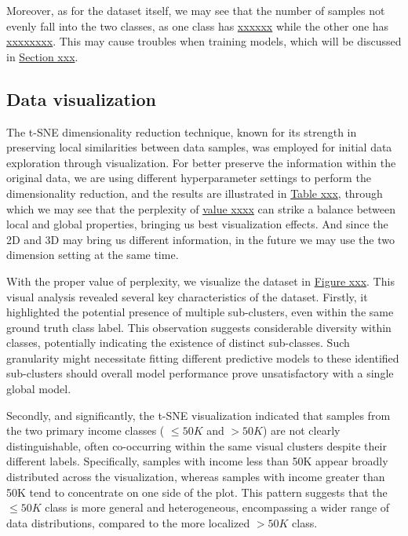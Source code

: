 \documentclass{article}
\begin{document}
Moreover, as for the dataset itself, we may see that the number of samples not evenly fall into the two classes, as one class has \underline{xxxxxx} while the other one has \underline{xxxxxxxx}. This may cause troubles when training models, which will be discussed in \underline{Section xxx}.



\subsection{Data visualization}



The t-SNE dimensionality reduction technique, known for its strength in preserving local similarities between data samples, was employed for initial data exploration through visualization. For better preserve the information within the original data, we are using different hyperparameter settings to perform the dimensionality reduction, and the results are illustrated in \underline{Table xxx}, through which we may see that the perplexity of \underline{value xxxx} can strike a balance between local and global properties, bringing us best visualization effects. And since the 2D and 3D may bring us different information, in the future we may use the two dimension setting at the same time.

With the proper value of perplexity, we visualize the dataset in \underline{Figure xxx}. This visual analysis revealed several key characteristics of the dataset. Firstly, it highlighted the potential presence of multiple sub-clusters, even within the same ground truth class label. This observation suggests considerable diversity within classes, potentially indicating the existence of distinct sub-classes. Such granularity might necessitate fitting different predictive models to these identified sub-clusters should overall model performance prove unsatisfactory with a single global model.

Secondly, and significantly, the t-SNE visualization indicated that samples from the two primary income classes ( $\le50K$ and $>50K$) are not clearly distinguishable, often co-occurring within the same visual clusters despite their different labels. Specifically, samples with income less than 50K appear broadly distributed across the visualization, whereas samples with income greater than 50K tend to concentrate on one side of the plot. This pattern suggests that the $\le50K$ class is more general and heterogeneous, encompassing a wider range of data distributions, compared to the more localized $>50K$ class.
\end{document}
